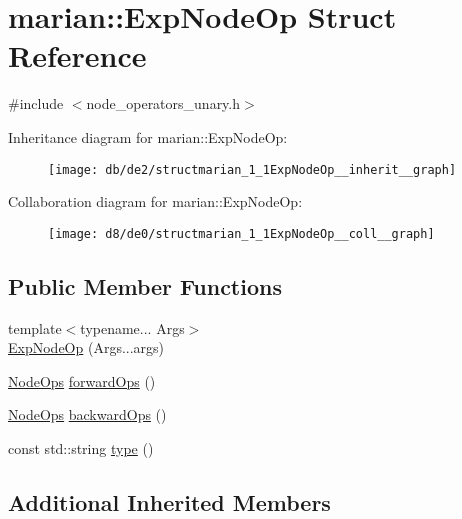 \hypertarget{structmarian_1_1ExpNodeOp}{}\section{marian\+:\+:Exp\+Node\+Op Struct Reference}
\label{structmarian_1_1ExpNodeOp}


{\ttfamily \#include $<$node\+\_\+operators\+\_\+unary.\+h$>$}



Inheritance diagram for marian\+:\+:Exp\+Node\+Op\+:
\nopagebreak
\begin{figure}[H]
\begin{center}
\leavevmode
\texttt{[image: db/de2/structmarian\_1\_1ExpNodeOp\_\_inherit\_\_graph]}
\end{center}
\end{figure}


Collaboration diagram for marian\+:\+:Exp\+Node\+Op\+:
\nopagebreak
\begin{figure}[H]
\begin{center}
\leavevmode
\texttt{[image: d8/de0/structmarian\_1\_1ExpNodeOp\_\_coll\_\_graph]}
\end{center}
\end{figure}
\subsection*{Public Member Functions}
\begin{DoxyCompactItemize}
\item 
{\footnotesize template$<$typename... Args$>$ }\\\hyperlink{structmarian_1_1ExpNodeOp_a0376b1cb4d29820a956a1df6cb667569}{Exp\+Node\+Op} (Args...\+args)
\item 
\hyperlink{namespacemarian_a4956376218cc236016c20bc4071470da}{Node\+Ops} \hyperlink{structmarian_1_1ExpNodeOp_af16da957d7201c081c7ccac9e2122a2e}{forward\+Ops} ()
\item 
\hyperlink{namespacemarian_a4956376218cc236016c20bc4071470da}{Node\+Ops} \hyperlink{structmarian_1_1ExpNodeOp_a99a3c11f354e675876e681abd964c99d}{backward\+Ops} ()
\item 
const std\+::string \hyperlink{structmarian_1_1ExpNodeOp_a8c2d1dcefe80f3124fe0502118ad72be}{type} ()
\end{DoxyCompactItemize}
\subsection*{Additional Inherited Members}


